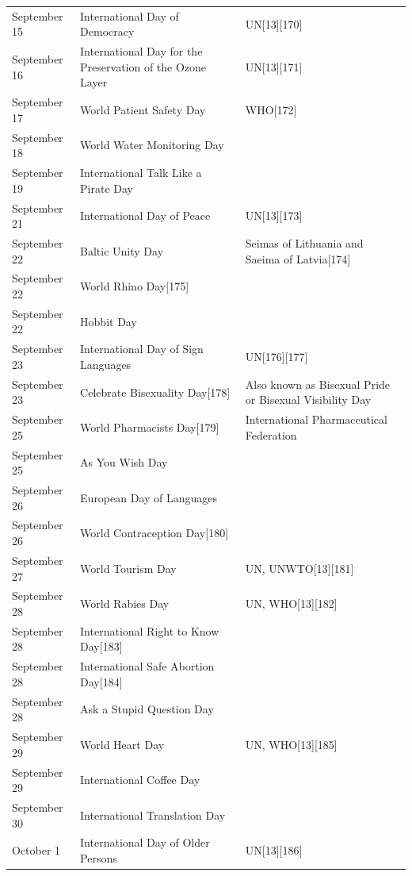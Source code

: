 \documentclass[
  openany]{book}
\begin{document}
\begin{longtable}[t]{>{\raggedright\arraybackslash}p{8em}>{\raggedright\arraybackslash}p{20em}>{\raggedright\arraybackslash}p{12em}}
\rowcolor{gray!6}  September 15 & International Day of Democracy & UN[13][170]\\
\addlinespace
September 16 & International Day for the Preservation of the Ozone Layer & UN[13][171]\\
\rowcolor{gray!6}  September 17 & World Patient Safety Day & WHO[172]\\
September 18 & World Water Monitoring Day & \\
\rowcolor{gray!6}  September 19 & International Talk Like a Pirate Day & \\
September 21 & International Day of Peace & UN[13][173]\\
\addlinespace
\rowcolor{gray!6}  September 22 & Baltic Unity Day & Seimas of Lithuania and Saeima of Latvia[174]\\
September 22 & World Rhino Day[175] & \\
\rowcolor{gray!6}  September 22 & Hobbit Day & \\
September 23 & International Day of Sign Languages & UN[176][177]\\
\rowcolor{gray!6}  September 23 & Celebrate Bisexuality Day[178] & Also known as Bisexual Pride or Bisexual Visibility Day\\
\addlinespace
September 25 & World Pharmacists Day[179] & International Pharmaceutical Federation\\
\rowcolor{gray!6}  September 25 & As You Wish Day & \\
September 26 & European Day of Languages & \\
\rowcolor{gray!6}  September 26 & World Contraception Day[180] & \\
September 27 & World Tourism Day & UN, UNWTO[13][181]\\
\addlinespace
\rowcolor{gray!6}  September 28 & World Rabies Day & UN, WHO[13][182]\\
September 28 & International Right to Know Day[183] & \\
\rowcolor{gray!6}  September 28 & International Safe Abortion Day[184] & \\
September 28 & Ask a Stupid Question Day & \\
\rowcolor{gray!6}  September 29 & World Heart Day & UN, WHO[13][185]\\
\addlinespace
September 29 & International Coffee Day & \\
\rowcolor{gray!6}  September 30 & International Translation Day & \\
October 1 & International Day of Older Persons & UN[13][186]\\

\end{longtable}
\end{document}

